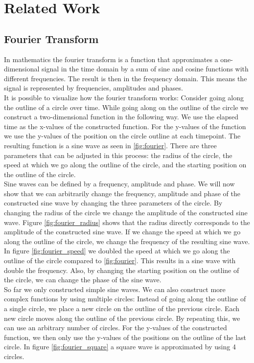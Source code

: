 \documentclass[thesis.tex]{subfiles}
\begin{document}
\chapter{Related Work}
\section{Fourier Transform} \label{fourier_transform}

In mathematics the fourier transform \cite{nixon2012feature} is a function that approximates a one-dimensional signal in the time domain by a sum of sine and cosine functions with different frequencies. The result is then in the frequency domain. This means the signal is represented by frequencies, amplitudes and phases.
\\ 
It is possible to visualize how the fourier transform works: Consider going along the outline of a circle over time. While going along on the outline of the circle we construct a two-dimensional function in the following way. We use the elapsed time as the x-values of the constructed function. For the y-values of the function we use the y-values of the position on the circle outline at each timepoint. The resulting function is a sine wave as seen in \ref{fig:fourier}. There are three parameters that can be adjusted in this process: the radius of the circle, the speed at which we go along the outline of the circle, and the starting position on the outline of the circle. \\
Sine waves can be defined by a frequency, amplitude and phase. We will now show that we can arbitrarily change the frequency, amplitude and phase of the constructed sine wave by changing the three parameters of the circle. By changing the radius of the circle we change the amplitude of the constructed sine wave. Figure \ref{fig:fourier_radius} shows that the radius directly corresponds to the amplitude of the constructed sine wave. If we change the speed at which we go along the outline of the circle, we change the frequency of the resulting sine wave. In figure \ref{fig:fourier_speed} we doubled the speed at which we go along the outline of the circle compared to \ref{fig:fourier}. This results in a sine wave with double the frequency. Also, by changing the starting position on the outline of the circle, we can change the phase of the sine wave. \\
So far we only constructed simple sine waves. We can also construct more complex functions by using multiple circles: Instead of going along the outline of a single circle, we place a new circle on the outline of the previous circle. Each new circle moves along the outline of the previous circle. By repeating this, we can use an arbitrary number of circles. For the y-values of the constructed function, we then only use the y-values of the positions on the outline of the last circle. In figure \ref{fig:fourier_square} a square wave is approximated by using 4 circles. 
\end{document}
